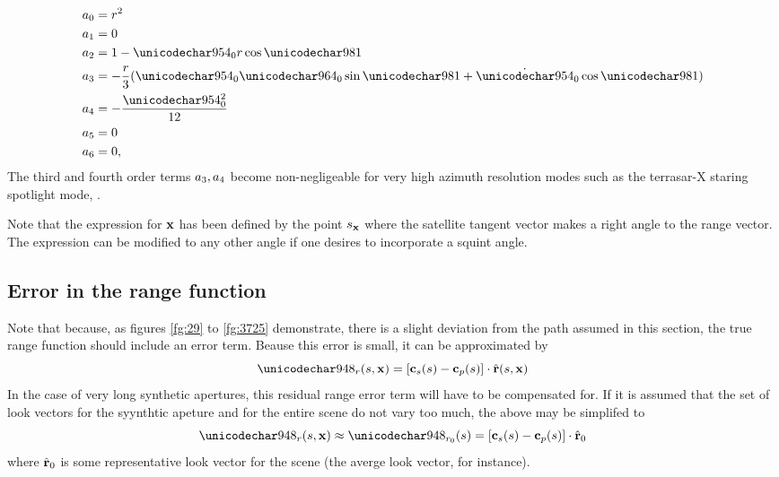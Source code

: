 \begin{align}
 \rcoeff_0 &= \targetrange^{2}\\
 \rcoeff_1 &= 0\\
 \rcoeff_2 &= 1 - \kappa_0\targetrange\cos\targetdepression\\
 \rcoeff_3 &= -\frac{\targetrange}{3}(\kappa_0\tau_0\sin\targetdepression + \dot{\kappa}_0\cos\targetdepression)\\
 \rcoeff_4 &= -\frac{\kappa_0^2}{12}\\
 \rcoeff_5 &= 0\\
 \rcoeff_6 &= 0,
\end{align}
The third and fourth order terms $a_3,a_4$ become non-negligeable for very high azimuth resolution modes such as the terrasar-X staring spotlight mode, \cite{Mittermayer}.
\par
Note that the expression for $\mathbf{\mathbf{x}}$ has been defined by the point $s_{\mathbf{x}}$ where the satellite tangent vector makes a right angle to the range vector. The expression can be modified to any other angle if one desires to incorporate a squint angle.
\subsection{Error in the range function}
Note that because, as figures \ref{fg:29} to \ref{fg:3725} demonstrate, there is a slight deviation from the path assumed in this section, the true range function should include an error term. Beause this error is small, it can be approximated by
\begin{equation}
 \rangeError(\parm, \vct\target) = [\sats(\parm)-\satp(\parm)]\cdot\uRangeVectorParm
\end{equation}
In the case of very long synthetic apertures, this residual range error term will have to be compensated for. If it is assumed that the set of look vectors for the syynthtic apeture and for the entire scene do not vary too much, the above may be simplifed to
\begin{equation}
 \rangeError(\parm, \vct\target) \approx \rangeErrorZero(\parm) = [\sats(\parm)-\satp(\parm)]\cdot\uRangeVectorParmZero
\end{equation}
where $\hat{\mathbf{r}}_0$ is some representative look vector for the scene (the averge look vector, for instance).
